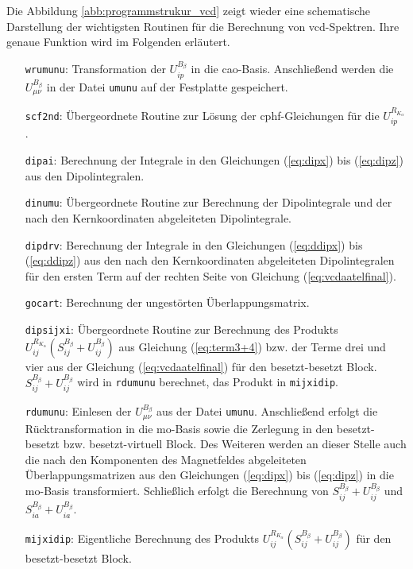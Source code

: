 	Die Abbildung \ref{abb:programmstrukur_vcd} zeigt wieder eine schematische Darstellung der wichtigsten Routinen für die Berechnung von \ac{vcd}-Spektren. Ihre genaue Funktion wird im Folgenden erläutert. 
\begin{itemize}
	\item[\texttt{wrumunu}:] Transformation der $U_{ip}^{B_\beta}$ in die \ac{cao}-Basis. Anschließend werden die $U_{\mu\nu}^{B_\beta}$ in der Datei \texttt{umunu} auf der Festplatte gespeichert.
	\item[\texttt{scf2nd}:] Übergeordnete Routine zur Lösung der \ac{cphf}-Gleichungen für die $U_{ip}^{R_{K_\alpha}}$.
	\item[\texttt{dipai}:] Berechnung der Integrale in den Gleichungen (\ref{eq:dipx}) bis (\ref{eq:dipz}) aus den Dipolintegralen.
	\item[\texttt{dinumu}:] Übergeordnete Routine zur Berechnung der Dipolintegrale und der nach den Kernkoordinaten abgeleiteten Dipolintegrale.
	\item[\texttt{dipdrv}:] Berechnung der Integrale in den Gleichungen (\ref{eq:ddipx}) bis (\ref{eq:ddipz}) aus den nach den Kernkoordinaten abgeleiteten Dipolintegralen für den ersten Term auf der rechten Seite von Gleichung (\ref{eq:vcdaatelfinal}).
	\item[\texttt{gocart}:] Berechnung der ungestörten Überlappungsmatrix.
	\item[\texttt{dipsijxi}:] Übergeordnete Routine zur Berechnung des Produkts $U_{ij}^{R_{K_\alpha}}\left(S_{ij}^{B_\beta}+U_{ij}^{B_\beta}\right)$ aus Gleichung (\ref{eq:term3+4}) bzw. der Terme drei und vier aus der Gleichung (\ref{eq:vcdaatelfinal}) für den besetzt-besetzt Block. $S_{ij}^{B_\beta}+U_{ij}^{B_\beta}$ wird in \texttt{rdumunu} berechnet, das Produkt in \texttt{mijxidip}.
	\item[\texttt{rdumunu}:] Einlesen der $U_{\mu\nu}^{B_\beta}$ aus der Datei \texttt{umunu}. Anschließend erfolgt die Rücktransformation in die \ac{mo}-Basis sowie die Zerlegung in den besetzt-besetzt bzw. besetzt-virtuell Block. Des Weiteren werden an dieser Stelle auch die nach den Komponenten des Magnetfeldes abgeleiteten Überlappungsmatrizen aus den Gleichungen (\ref{eq:dipx}) bis (\ref{eq:dipz}) in die \ac{mo}-Basis transformiert. Schließlich erfolgt die Berechnung von $S_{ij}^{B_\beta}+U_{ij}^{B_\beta}$ und $S_{ia}^{B_\beta}+U_{ia}^{B_\beta}$.
	\item[\texttt{mijxidip}:] Eigentliche Berechnung des Produkts $U_{ij}^{R_{K_\alpha}}\left(S_{ij}^{B_\beta}+U_{ij}^{B_\beta}\right)$ für den besetzt-besetzt Block.

\end{itemize}
